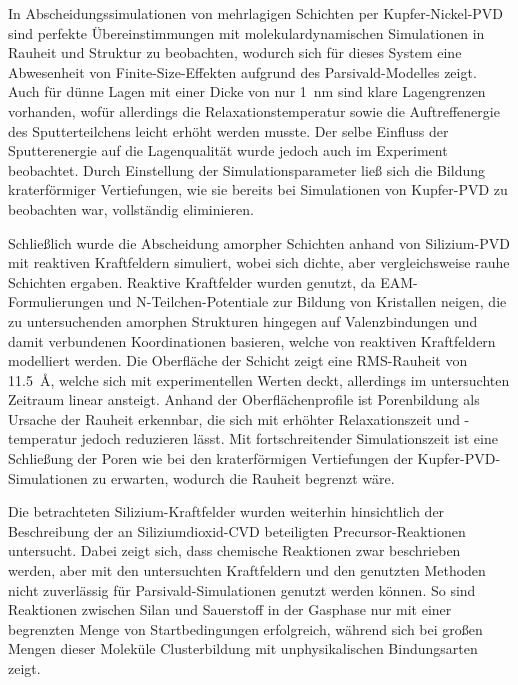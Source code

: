 In Abscheidungssimulationen von mehrlagigen Schichten per Kupfer-Nickel-PVD sind perfekte Übereinstimmungen mit molekulardynamischen Simulationen in Rauheit und Struktur zu beobachten, wodurch sich für dieses System eine Abwesenheit von Finite-Size-Effekten aufgrund des Parsivald-Modelles zeigt.
Auch für dünne Lagen mit einer Dicke von nur \SI{1}{\nano\meter} sind klare Lagengrenzen vorhanden, wofür allerdings die Relaxationstemperatur sowie die Auftreffenergie des Sputterteilchens leicht erhöht werden musste.
Der selbe Einfluss der Sputterenergie auf die Lagenqualität wurde jedoch auch im Experiment beobachtet.
Durch Einstellung der Simulationsparameter ließ sich die Bildung kraterförmiger Vertiefungen, wie sie bereits bei Simulationen von Kupfer-PVD zu beobachten war, vollständig eliminieren.

Schließlich wurde die Abscheidung amorpher Schichten anhand von Silizium-PVD mit reaktiven Kraftfeldern simuliert, wobei sich dichte, aber vergleichsweise rauhe Schichten ergaben.
Reaktive Kraftfelder wurden genutzt, da EAM-Formulierungen und N-Teilchen-Potentiale zur Bildung von Kristallen neigen, die zu untersuchenden amorphen Strukturen hingegen auf Valenzbindungen und damit verbundenen Koordinationen basieren, welche von reaktiven Kraftfeldern modelliert werden.
Die  Oberfläche der Schicht zeigt eine RMS-Rauheit von \SI{11.5}{\angstrom}, welche sich mit experimentellen Werten deckt, allerdings im untersuchten Zeitraum linear ansteigt.
Anhand der Oberflächenprofile ist Porenbildung als Ursache der Rauheit erkennbar, die sich mit erhöhter Relaxationszeit und -temperatur jedoch reduzieren lässt.
Mit fortschreitender Simulationszeit ist eine Schließung der Poren wie bei den kraterförmigen Vertiefungen der Kupfer-PVD-Simulationen zu erwarten, wodurch die Rauheit begrenzt wäre.


Die betrachteten Silizium-Kraftfelder wurden weiterhin hinsichtlich der Beschreibung der an Siliziumdioxid-CVD beteiligten Precursor-Reaktionen untersucht.
Dabei zeigt sich, dass chemische Reaktionen zwar beschrieben werden, aber mit den untersuchten Kraftfeldern und den genutzten Methoden nicht zuverlässig für Parsivald-Simulationen genutzt werden können.
So sind Reaktionen zwischen Silan und Sauerstoff in der Gasphase nur mit einer begrenzten Menge von Startbedingungen erfolgreich, während sich bei großen Mengen dieser Moleküle Clusterbildung mit unphysikalischen Bindungsarten zeigt.

